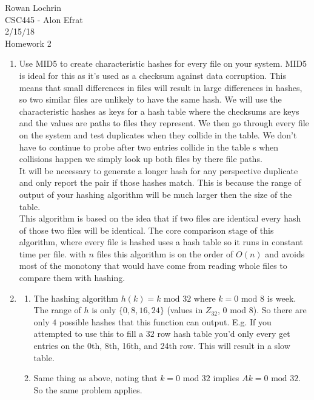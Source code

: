 \documentclass[11pt]{article}
\begin{document}
\begin{flushleft}
	Rowan Lochrin \\
	CSC445 - Alon Efrat\\
	2/15/18 \\
	Homework 2
\end{flushleft}
\begin{enumerate}
	\item Use MID5 to create characteristic hashes for every file on your
		system. MID5 is ideal for this as it's used as a checksum against
		data corruption. This means that small differences in files will result in
		large differences in hashes, so two similar files are unlikely to
		have the same hash.  We will use the characteristic hashes as
		keys for a
		hash table where the checksums are keys and the values are paths to files they
		represent. We then go through every file on the system and
		test duplicates when they collide in the table. We
		don't have to continue to probe after two entries collide in the
		table s
		when collisions happen we simply look up both files by there
		file paths.\\
		It will be necessary to generate a longer
		hash for any perspective duplicate and only report the pair if those
		hashes match. This is because the range of output of your
		hashing algorithm will be much larger then the size of the
		table.\\
		This algorithm is based on the idea that if two files are
		identical every hash of those two files will be identical. The
		core comparison stage of this algorithm, where every file is
		hashed uses a hash table so it runs in constant time per file.
		with $n$ files this algorithm is on the order of $O(n)$ and
		avoids most of the monotony that would have come from reading
		whole files to compare them with hashing.
	\item 
		\begin{enumerate}
			\item The hashing algorithm $h(k) = k\text{ mod }32$ where $k =
				0 \text{ mod } 8$ is week. The range of $h$ is only
				$\{0,8,16,24\}$ (values in $Z_{32}$, $0$ mod
				$8$). So there are only $4$ possible
				hashes that this function can output. E.g. If
				you attempted to use this to fill a $32$ row
				hash table you'd only every get entries on the
				0th, 8th, 16th, and 24th row. This will result in a
				slow table.
			\item Same thing as above, noting that $k = 0 \text{ mod
				} 32$ implies  $Ak = 0 \text{ mod } 32$.
				So the same problem applies.

\end{enumerate}
\end{enumerate}
\end{document}
